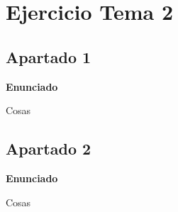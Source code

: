 \documentclass[a4paper]{article}
\title {\fbox{\Huge{\textbf{Ejercicio Tema 2}}}}
\author {\fbox{Ana Buendía Ruiz-Azuaga}}
\begin{document}
\maketitle


\section{Ejercicio Tema 2}

\subsection{Apartado 1}

\textbf{Enunciado}

Cosas

\subsection{Apartado 2}
\textbf{Enunciado}

Cosas
\end{document}
